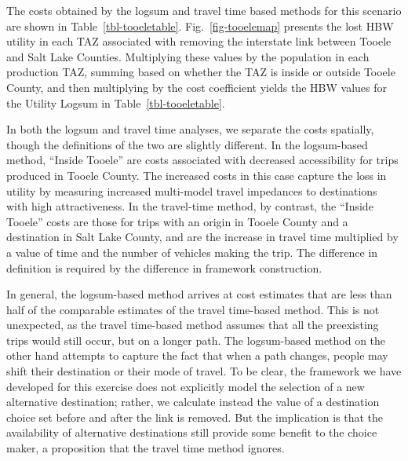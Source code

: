 \documentclass[]{ascelike-new}
\begin{document}
The costs obtained by the logsum and travel time based methods for this
scenario are shown in Table~\ref{tbl-tooeletable}.
Fig.~\ref{fig-tooelemap} presents the lost HBW utility in each TAZ
associated with removing the interstate link between Tooele and Salt
Lake Counties. Multiplying these values by the population in each
production TAZ, summing based on whether the TAZ is inside or outside
Tooele County, and then multiplying by the cost coefficient yields the
HBW values for the Utility Logsum in Table~\ref{tbl-tooeletable}.

In both the logsum and travel time analyses, we separate the costs
spatially, though the definitions of the two are slightly different. In
the logsum-based method, ``Inside Tooele'' are costs associated with
decreased accessibility for trips produced in Tooele County. The
increased costs in this case capture the loss in utility by measuring
increased multi-model travel impedances to destinations with high
attractiveness. In the travel-time method, by contrast, the ``Inside
Tooele'' costs are those for trips with an origin in Tooele County and a
destination in Salt Lake County, and are the increase in travel time
multiplied by a value of time and the number of vehicles making the
trip. The difference in definition is required by the difference in
framework construction.

In general, the logsum-based method arrives at cost estimates that are
less than half of the comparable estimates of the travel time-based
method. This is not unexpected, as the travel time-based method assumes
that all the preexisting trips would still occur, but on a longer path.
The logsum-based method on the other hand attempts to capture the fact
that when a path changes, people may shift their destination or their
mode of travel. To be clear, the framework we have developed for this
exercise does not explicitly model the selection of a new alternative
destination; rather, we calculate instead the value of a destination
choice set before and after the link is removed. But the implication is
that the availability of alternative destinations still provide some
benefit to the choice maker, a proposition that the travel time method
ignores.
\end{document}
